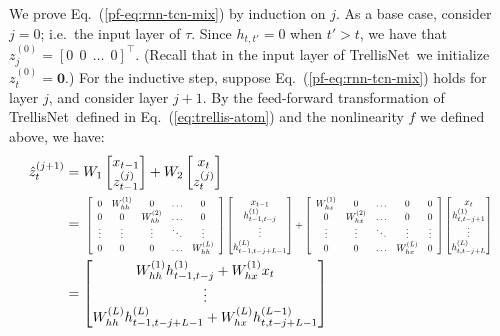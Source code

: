 \documentclass{article} \usepackage{iclr2019_conference,times}
\newcommand{\model}{TrellisNet}
\newenvironment{proofidx}[1]{\renewcommand{\proofname}{Proof of Theorem #1}\proof}{\endproof}
\begin{document}
\begin{proofidx}{\ref{thm:trellisnet-rnn}}
We prove Eq.~(\ref{pf-eq:rnn-tcn-mix}) by induction on $j$. As a base case, consider $j=0$; i.e.\ the input layer of $\tau$. Since $h_{t,t'}=0$ when $t'>t$, we have that \small$z_j^{(0)} = [0 \ \ 0 \ \ \dots \ \ 0]^\top$\normalsize. (Recall that in the input layer of \model~we initialize \small$z_t^{(0)}=\mathbf{0}$\normalsize.) For the inductive step, suppose Eq.~(\ref{pf-eq:rnn-tcn-mix}) holds for layer $j$, and consider layer $j+1$. By the feed-forward transformation of \model~defined in Eq.~(\ref{eq:trellis-atom}) and the nonlinearity $f$ we defined above, we have:
\begin{align}
\hat{z}_t^{(j+1)} &= W_1 \begin{bmatrix}x_{t-1} \\ z_{t-1}^{(j)}\end{bmatrix} + W_2 \begin{bmatrix}x_t \\ z_t^{(j)}\end{bmatrix} \\
&=
\resizebox{.85\hsize}{!}{
$
\left[
\begin{array}{ccccc}
0 & W_{hh}^{(1)} & 0 & \ldots & 0 \\
0 & 0 & W_{hh}^{(2)} & \ldots & 0 \\
\vdots & \vdots & \vdots & \ddots & \vdots \\
0 & 0 & 0 & \ldots & W_{hh}^{(L)}
\end{array}
\right] \begin{bmatrix} x_{t-1} \\ h_{t-1, t-j}^{(1)} \\ \vdots \\ h_{t-1, t-j+L-1}^{(L)} \end{bmatrix} +
\left[
\begin{array}{ccccc}
W_{hx}^{(1)} & 0 & \ldots & 0 & 0 \\
0 & W_{hx}^{(2)} & \ldots & 0 & 0 \\
\vdots & \vdots & \ddots & \vdots & \vdots \\
0 & 0 & \ldots & W_{hx}^{(L)} & 0
\end{array}
\right] \begin{bmatrix} x_t \\ h_{t, t-j+1}^{(1)} \\ \vdots \\ h_{t, t-j+L}^{(L)} \end{bmatrix}
$} \\
&=
\begin{bmatrix} W_{hh}^{(1)} h_{t-1,t-j}^{(1)} + W_{hx}^{(1)}x_t \\ \vdots \\ W_{hh}^{(L)} h_{t-1,t-j+L-1}^{(L)} + W_{hx}^{(L)} h_{t, t-j+L-1}^{(L-1)} \end{bmatrix}

\end{align}
\end{proofidx}
\end{document}
